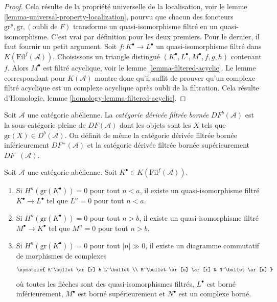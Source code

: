 \begin{proof}
Cela résulte de la propriété universelle de la localisation, voir le
lemme \ref{lemma-universal-property-localization}, pourvu que chacun des
foncteurs $\text{gr}^p, \text{gr}, (\text{oubli de }F)$ transforme un
quasi-isomorphisme filtré en un quasi-isomorphisme. C'est vrai par définition
pour les deux premiers. Pour le dernier, il faut fournir un petit argument.
Soit $f : K^\bullet \to L^\bullet$ un quasi-isomorphisme filtré dans
$K(\text{Fil}^f(\mathcal{A}))$. Choisissons un triangle distingué
$(K^\bullet, L^\bullet, M^\bullet, f, g, h)$ contenant $f$. Alors $M^\bullet$
est filtré acyclique, voir le lemme \ref{lemma-filtered-acyclic}. Le lemme
correspondant pour $K(\mathcal{A})$ montre donc qu'il suffit de prouver qu'un
complexe filtré acyclique est un complexe acyclique après oubli de la
filtration. Cela résulte d'Homologie, lemme
\ref{homology-lemma-filtered-acyclic}.
\end{proof}

\begin{definition}
\label{definition-filtered-derived-bounded}
Soit $\mathcal{A}$ une catégorie abélienne. La
{\it catégorie dérivée filtrée bornée} $DF^b(\mathcal{A})$ est la
sous-catégorie pleine de $DF(\mathcal{A})$ dont les objets sont les $X$ tels
que $\text{gr}(X) \in D^b(\mathcal{A})$. On définit de même la catégorie
dérivée filtrée bornée inférieurement $DF^{+}(\mathcal{A})$ et la catégorie
dérivée filtrée bornée supérieurement $DF^{-}(\mathcal{A})$.
\end{definition}

\begin{lemma}
\label{lemma-filtered-complex-cohomology-bounded}
Soit $\mathcal{A}$ une catégorie abélienne. Soit
$K^\bullet \in K(\text{Fil}^f(\mathcal{A}))$.
\begin{enumerate}
\item Si $H^n(\text{gr}(K^\bullet)) = 0$ pour tout $n < a$, il existe un
quasi-isomorphisme filtré $K^\bullet \to L^\bullet$ tel que $L^n = 0$ pour
tout $n < a$.
\item Si $H^n(\text{gr}(K^\bullet)) = 0$ pour tout $n > b$, il existe un
quasi-isomorphisme filtré $M^\bullet \to K^\bullet$ tel que $M^n = 0$ pour
tout $n > b$.
\item Si $H^n(\text{gr}(K^\bullet)) = 0$ pour tout $|n| \gg 0$, il existe un
diagramme commutatif de morphismes de complexes
$$
\xymatrix{
K^\bullet \ar[r] & L^\bullet \\
M^\bullet \ar[u] \ar[r] & N^\bullet \ar[u]
}
$$
où toutes les flèches sont des quasi-isomorphismes filtrés, $L^\bullet$ est
borné inférieurement, $M^\bullet$ est borné supérieurement et $N^\bullet$ est
un complexe borné.
\end{enumerate}
\end{lemma}

